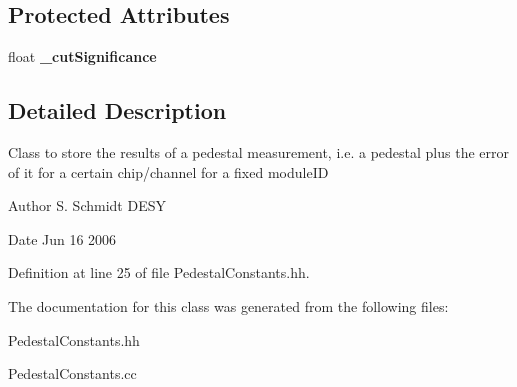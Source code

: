 \subsection*{Protected Attributes}
\begin{DoxyCompactItemize}
\item 
float {\bfseries \_\-cutSignificance}\label{classCALICE_1_1PedestalConstants_a6ceabef97402ca961f73c04a543837ed}

\end{DoxyCompactItemize}


\subsection{Detailed Description}
Class to store the results of a pedestal measurement, i.e. a pedestal plus the error of it for a certain chip/channel for a fixed moduleID \begin{DoxyAuthor}{Author}
S. Schmidt DESY 
\end{DoxyAuthor}
\begin{DoxyDate}{Date}
Jun 16 2006 
\end{DoxyDate}


Definition at line 25 of file PedestalConstants.hh.

The documentation for this class was generated from the following files:\begin{DoxyCompactItemize}
\item 
PedestalConstants.hh\item 
PedestalConstants.cc\end{DoxyCompactItemize}
